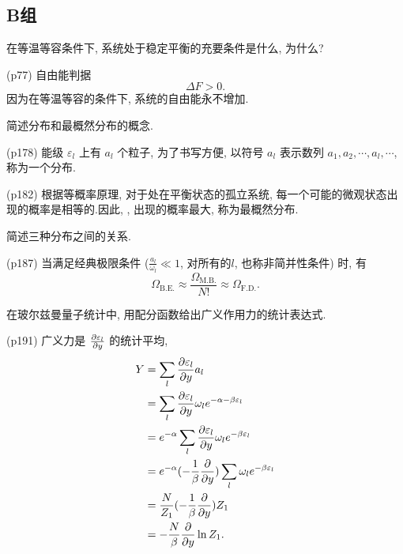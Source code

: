 \subsection{B组}
\begin{questions}
  \qt 在等温等容条件下, 系统处于稳定平衡的充要条件是什么, 为什么?
  \begin{solution}
    (p77) 自由能判据
    \begin{equation}
      \Delta F > 0.
    \end{equation}
    因为在等温等容的条件下, 系统的自由能永不增加.
  \end{solution}
  \qt 简述分布和最概然分布的概念.
  \begin{solution}
    (p178) 能级 $\varepsilon_l$ 上有 $a_l$ 个粒子, 为了书写方便, 以符号 $a_l$ 表示数列 $a_1, a_2, \cdots, a_l, \cdots$, 称为一个分布.

    (p182) 根据等概率原理, 对于处在平衡状态的孤立系统, 每一个可能的微观状态出现的概率是相等的.因此, , 出现的概率最大, 称为最概然分布.
  \end{solution}
  \qt 简述三种分布之间的关系.
  \begin{solution}
    (p187) 当满足经典极限条件 ($\frac{a_l}{\omega_l}\ll 1$, 对所有的$l$, 也称非简并性条件) 时, 有
    \begin{equation}
      \varOmega_{\mathrm{B.E.}} \approx \frac{\varOmega_{\mathrm{M.B.}}}{N!} \approx \varOmega_{\mathrm{F.D.}}.
    \end{equation}
  \end{solution}
  \qt 在玻尔兹曼量子统计中, 用配分函数给出广义作用力的统计表达式.
  \begin{solution}
    (p191) 广义力是 $\pdv{\varepsilon_l}{y}$ 的统计平均,
    \begin{equation}
      \begin{aligned}
        Y & = \sum_l \pdv{\varepsilon_l}{y} a_l                                            \\
          & = \sum_l \pdv{\varepsilon_l}{y} \omega_l e^{-\alpha-\beta\varepsilon_l}        \\
          & = e^{-\alpha} \sum_l \pdv{\varepsilon_l}{y} \omega_l e^{-\beta\varepsilon_l}   \\
          & = e^{-\alpha} (-\frac{1}{\beta}\pdv{y})\sum_l \omega_l e^{-\beta\varepsilon_l} \\
          & = \frac{N}{Z_1} (-\frac{1}{\beta}\pdv{y}) Z_1                                  \\
          & = -\frac{N}{\beta}\pdv{y}\ln Z_1.
      \end{aligned}
    \end{equation}
  \end{solution}
\end{questions}